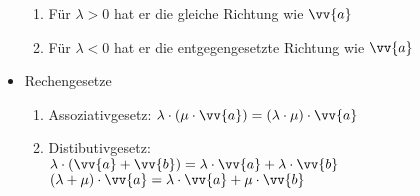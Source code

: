 \documentclass[a4paper,twocolumn,10pt]{onepgnote1}
\begin{document}
\begin{itemize}
\begin{enumerate}
\item Für $\lambda > 0$ hat er die gleiche Richtung wie $\vv{a}$ \\
\item Für $\lambda < 0$ hat er die entgegengesetzte Richtung wie $\vv{a}$
\end{enumerate}
\item Rechengesetze\\
\begin{enumerate}
\item Assoziativgesetz: $\lambda \cdot  \left(\mu \cdot \vv{a}\right) = \left(\lambda\cdot\mu\right)\cdot \vv{a}$\\
\item Distibutivgesetz:\\ \hspace*{0.5cm} $\lambda \cdot \left(\vv{a} + \vv{b}\right) = \lambda \cdot \vv{a}+ \lambda \cdot \vv{b}$\\ \hspace*{0.5cm} $\left(\lambda + \mu \right)\cdot \vv{a} = \lambda \cdot \vv{a} + \mu \cdot \vv{b}$
\end{enumerate}
\end{itemize}
\end{document}
